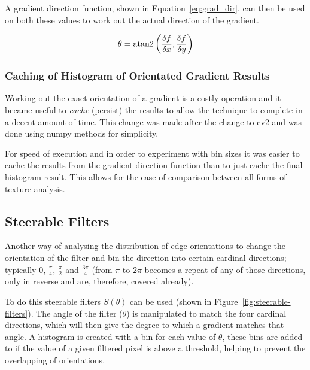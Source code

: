 A gradient direction function, shown in Equation~\ref{eq:grad_dir}, can then be used on both these
values to work out the actual direction of the gradient.

\begin{equation} \label{eq:grad_dir}
\theta = {\rm atan2}\left( \frac{\delta f}{\delta x}, \frac{\delta f}{\delta y} \right)
\end{equation}

\subsubsection{Caching of Histogram of Orientated Gradient Results}\label{sec:hog-canning}
Working out the exact orientation of a gradient is a costly operation and it became useful to
\emph{cache} (persist) the results to allow the technique to complete in a decent amount of time.
This change was made after the change to \gls{cv2} and was done using numpy methods for
simplicity. 

For speed of execution and in order to experiment with bin sizes it was easier to cache the 
results from the gradient direction function than to just cache the final histogram result. This
allows for the ease of comparison between all forms of texture analysis.

\subsection{Steerable Filters}
Another way of analysing the distribution of edge orientations to change the orientation of the filter and bin the direction into 
certain cardinal directions; typically $0$, $\frac{\pi}{4}$, $\frac{\pi}{2}$ and $\frac{3\pi}{4}$
(from $\pi$ to $2\pi$ becomes a repeat of any of those directions, only in reverse and are, 
therefore, covered already).

To do this steerable filters $S(\theta)$ can be used (shown in Figure~\ref{fig:steerable-filters}). 
The angle of the filter ($\theta$) is manipulated to match the four cardinal directions, which 
will then give the degree to which a gradient matches that angle. A histogram is created with a
bin for each value of $\theta$, these bins are added to if the value of a given filtered pixel is
above a threshold, helping to prevent the overlapping of orientations.

